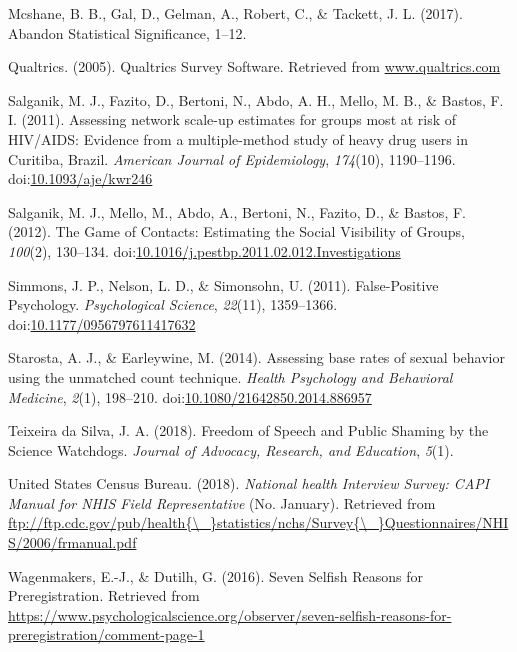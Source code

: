 \documentclass[jou]{apa6}
\theoremstyle{definition}
\theoremstyle{definition}
\theoremstyle{definition}
\theoremstyle{remark}
\begin{document}
\hypertarget{ref-Mcshane2017}{}
Mcshane, B. B., Gal, D., Gelman, A., Robert, C., \& Tackett, J. L.
(2017). Abandon Statistical Significance, 1--12.

\hypertarget{ref-Qualtrics}{}
Qualtrics. (2005). Qualtrics Survey Software. Retrieved from
\url{www.qualtrics.com}

\hypertarget{ref-Salganik2011}{}
Salganik, M. J., Fazito, D., Bertoni, N., Abdo, A. H., Mello, M. B., \&
Bastos, F. I. (2011). Assessing network scale-up estimates for groups
most at risk of HIV/AIDS: Evidence from a multiple-method study of heavy
drug users in Curitiba, Brazil. \emph{American Journal of Epidemiology},
\emph{174}(10), 1190--1196.
doi:\href{https://doi.org/10.1093/aje/kwr246}{10.1093/aje/kwr246}

\hypertarget{ref-Salganik2012}{}
Salganik, M. J., Mello, M., Abdo, A., Bertoni, N., Fazito, D., \&
Bastos, F. (2012). The Game of Contacts: Estimating the Social
Visibility of Groups, \emph{100}(2), 130--134.
doi:\href{https://doi.org/10.1016/j.pestbp.2011.02.012.Investigations}{10.1016/j.pestbp.2011.02.012.Investigations}

\hypertarget{ref-Simmons2011}{}
Simmons, J. P., Nelson, L. D., \& Simonsohn, U. (2011). False-Positive
Psychology. \emph{Psychological Science}, \emph{22}(11), 1359--1366.
doi:\href{https://doi.org/10.1177/0956797611417632}{10.1177/0956797611417632}

\hypertarget{ref-Starosta2014}{}
Starosta, A. J., \& Earleywine, M. (2014). Assessing base rates of
sexual behavior using the unmatched count technique. \emph{Health
Psychology and Behavioral Medicine}, \emph{2}(1), 198--210.
doi:\href{https://doi.org/10.1080/21642850.2014.886957}{10.1080/21642850.2014.886957}

\hypertarget{ref-TeixeiradaSilva2018}{}
Teixeira da Silva, J. A. (2018). Freedom of Speech and Public Shaming by
the Science Watchdogs. \emph{Journal of Advocacy, Research, and
Education}, \emph{5}(1).

\hypertarget{ref-NHIS2006}{}
United States Census Bureau. (2018). \emph{National health Interview
Survey: CAPI Manual for NHIS Field Representative} (No. January).
Retrieved from
\href{ftp://ftp.cdc.gov/pub/health\%7B/_\%7Dstatistics/nchs/Survey\%7B/_\%7DQuestionnaires/NHIS/2006/frmanual.pdf}{ftp://ftp.cdc.gov/pub/health\{\textbackslash{}\_\}statistics/nchs/Survey\{\textbackslash{}\_\}Questionnaires/NHIS/2006/frmanual.pdf}

\hypertarget{ref-Wagenmakers2016}{}
Wagenmakers, E.-J., \& Dutilh, G. (2016). Seven Selfish Reasons for
Preregistration. Retrieved from
\url{https://www.psychologicalscience.org/observer/seven-selfish-reasons-for-preregistration/comment-page-1}
\end{document}
